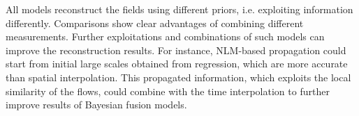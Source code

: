 All models reconstruct the fields using different priors, i.e. exploiting information differently. Comparisons show clear advantages of combining different measurements. Further exploitations and combinations of such models can improve the reconstruction results. For instance, NLM-based propagation could start from initial large scales obtained from regression, which are more accurate than spatial interpolation. This propagated information, which exploits the local similarity of the flows, could combine with the time interpolation to further improve results of Bayesian fusion models. 

